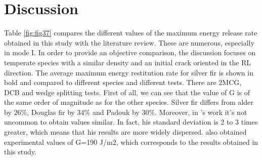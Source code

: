 \section{Discussion}

Table \ref{fig:fig37} compares the different values of the maximum energy release rate obtained in this study with the literature review. These are numerous, especially in mode I. In order to provide an objective comparison, the discussion focuses on temperate species with a similar density and an initial crack oriented in the RL direction. The average maximum energy restitution rate for silver fir is shown in bold and compared to different species and different tests. There are 2MCG, DCB and wedge splitting tests.
First of all, we can see that the value of G is of the same order of magnitude as for the other species. Silver fir differs from alder by $26 \%$, Douglas fir by $34 \%$ and Padouk by $30 \%$. Moreover, in \cite{Odounga2018phd}'s work it's not uncommon to obtain values similar. In fact, his standard deviation is 2 to 3 times greater, which means that his results are more widely dispersed.
\cite{Xavieretal2014} also obtained experimental values of G=190 J/m2, which corresponds to the results obtained in this study.

